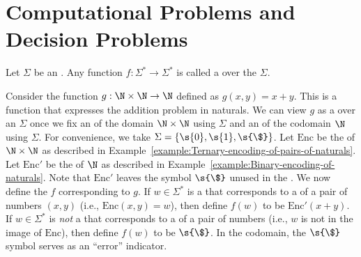 

\section{Computational Problems and Decision Problems}
\label{section:Computational-Problems-and-Decision-Problems}


\begin{flex}
\begin{definition} \label{definition:Computational-problem}
Let $\Sigma$ be an . Any function $f: \Sigma^* \to \Sigma^*$ is called a  over the  $\Sigma$. 
\end{definition}

\begin{example} \label{example:Addition-as-a-computational-problem}
Consider the function $g:\N \times \N \to \N$ defined as $g(x, y) = x + y$. 
This is a function that expresses the addition problem in naturals. 
We can view $g$ as a  over an  $\Sigma$ once we fix an  of the domain $\N \times \N$ using $\Sigma$ and an  of the codomain $\N$ using $\Sigma$. 
For convenience, we take $\Sigma = \{\s{0},\s{1},\s{\$}\}$. Let $\text{Enc}$ be the  of $\N \times \N$ as described in Example~\ref{example:Ternary-encoding-of-pairs-of-naturals}. 
Let $\text{Enc}'$ be the  of $\N$ as described in Example~\ref{example:Binary-encoding-of-naturals}. 
Note that $\text{Enc}'$ leaves the symbol $\s{\$}$ unused in the . 
We now define the  $f$ corresponding to $g$. 
If $w \in \Sigma^*$ is a  that corresponds to a  of a pair of numbers $(x, y)$ (i.e., $\text{Enc}(x,y) = w$), then define $f(w)$ to be $\text{Enc}'(x+y)$. 
If $w \in \Sigma^*$ is \emph{not} a  that corresponds to a  of a pair of numbers (i.e., $w$ is not in the image of $\text{Enc}$), then define $f(w)$ to be $\s{\$}$. 
In the codomain, the $\s{\$}$ symbol serves as an ``error'' indicator.
\end{example}
\end{flex}


